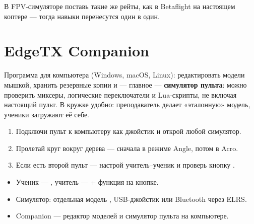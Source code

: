\begin{tip}
В FPV-симуляторе поставь такие же рейты, как в Betaflight на настоящем коптере --- тогда
навыки перенесутся один в один.
\end{tip}

\section{EdgeTX Companion}

Программа для компьютера (Windows, macOS, Linux): редактировать модели мышкой, хранить
резервные копии и --- главное --- \textbf{симулятор пульта}: можно проверить миксеры,
логические переключатели и Lua-скрипты, не включая настоящий пульт. В кружке удобно:
преподаватель делает «эталонную» модель, ученики загружают её себе.

\begin{tryit}
\begin{enumerate}
  \item Подключи пульт к компьютеру как джойстик и открой любой симулятор.
  \item Пролетай круг вокруг дерева --- сначала в режиме Angle, потом в Acro.
  \item Если есть второй пульт --- настрой учитель--ученик и проверь кнопку .
\end{enumerate}
\end{tryit}

\begin{summary}
\begin{itemize}
  \item Ученик --- , учитель ---  + функция  на кнопке.
  \item Симулятор: отдельная модель , USB-джойстик или Bluetooth через ELRS.
  \item Companion --- редактор моделей и симулятор пульта на компьютере.
\end{itemize}
\end{summary}
